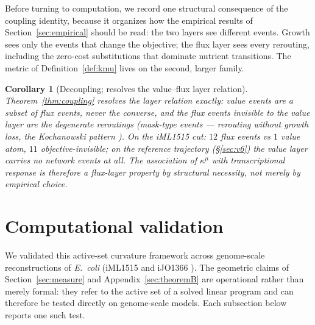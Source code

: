 \documentclass[11pt,a4paper]{article}
\theoremstyle{plain}
\newtheorem{corollary}[theorem]{Corollary}
\theoremstyle{definition}
\theoremstyle{remark}
\newcommand{\kmu}{\kappa^{\mu}}
\begin{document}
Before turning to computation, we record one structural consequence of the
coupling identity, because it organizes how the empirical results of
Section~\ref{sec:empirical} should be read: the two layers see different
events. Growth sees only the events that change the objective; the flux
layer sees every rerouting, including the zero-cost substitutions that
dominate nutrient transitions. The metric of Definition~\ref{def:kmu} lives
on the second, larger family.

\begin{corollary}[Decoupling; resolves the value--flux layer
relation]\label{cor:valueflux}
Theorem~\ref{thm:coupling} resolves the layer relation exactly: value
events are a subset of flux events, never the converse, and the flux
events invisible to the value layer are the degenerate reroutings
(mask-type events --- rerouting without growth loss, the Kochanowski pattern \citep{kochanowski2013}). On the iML1515 cut: $12$ flux events vs $1$ value atom, $11$ objective-invisible; on the reference trajectory (\S\ref{sec:v6}) the
value layer carries no network events at all. The association of
$\kmu$ with transcriptional response is therefore a flux-layer
property by structural necessity, not merely by empirical choice.
\end{corollary}
\section{Computational validation}\label{sec:computational}

We validated this active-set curvature framework across genome-scale
reconstructions of \emph{E.~coli} (iML1515 \citep{monk2017} and
iJO1366 \citep{orth2011}). The geometric claims of
Section~\ref{sec:measure} and Appendix~\ref{sec:theoremB} are
operational
rather than merely formal: they refer to the active set of a solved
linear program and can therefore be tested directly on genome-scale
models. Each subsection below reports one such test.
\end{document}
